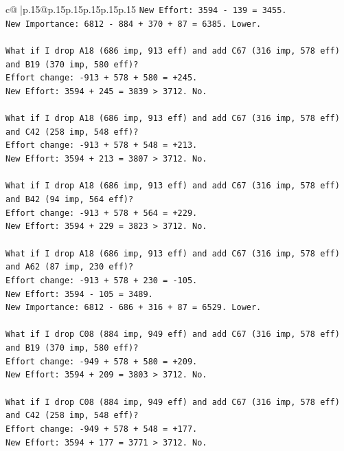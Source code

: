 \documentclass{article}
\begin{document}
{\begin{supertabular}{c@{$\;$}|p{.15\linewidth}@{}p{.15\linewidth}p{.15\linewidth}p{.15\linewidth}p{.15\linewidth}p{.15\linewidth}}
{{{\texttt{New Effort: 3594 {-} 139 = 3455.} \\
\texttt{New Importance: 6812 {-} 884 + 370 + 87 = 6385. Lower.} \\
\\ 
\texttt{What if I drop A18 (686 imp, 913 eff) and add C67 (316 imp, 578 eff) and B19 (370 imp, 580 eff)?} \\
\texttt{Effort change: {-}913 + 578 + 580 = +245.} \\
\texttt{New Effort: 3594 + 245 = 3839 > 3712. No.} \\
\\ 
\texttt{What if I drop A18 (686 imp, 913 eff) and add C67 (316 imp, 578 eff) and C42 (258 imp, 548 eff)?} \\
\texttt{Effort change: {-}913 + 578 + 548 = +213.} \\
\texttt{New Effort: 3594 + 213 = 3807 > 3712. No.} \\
\\ 
\texttt{What if I drop A18 (686 imp, 913 eff) and add C67 (316 imp, 578 eff) and B42 (94 imp, 564 eff)?} \\
\texttt{Effort change: {-}913 + 578 + 564 = +229.} \\
\texttt{New Effort: 3594 + 229 = 3823 > 3712. No.} \\
\\ 
\texttt{What if I drop A18 (686 imp, 913 eff) and add C67 (316 imp, 578 eff) and A62 (87 imp, 230 eff)?} \\
\texttt{Effort change: {-}913 + 578 + 230 = {-}105.} \\
\texttt{New Effort: 3594 {-} 105 = 3489.} \\
\texttt{New Importance: 6812 {-} 686 + 316 + 87 = 6529. Lower.} \\
\\ 
\texttt{What if I drop C08 (884 imp, 949 eff) and add C67 (316 imp, 578 eff) and B19 (370 imp, 580 eff)?} \\
\texttt{Effort change: {-}949 + 578 + 580 = +209.} \\
\texttt{New Effort: 3594 + 209 = 3803 > 3712. No.} \\
\\ 
\texttt{What if I drop C08 (884 imp, 949 eff) and add C67 (316 imp, 578 eff) and C42 (258 imp, 548 eff)?} \\
\texttt{Effort change: {-}949 + 578 + 548 = +177.} \\
\texttt{New Effort: 3594 + 177 = 3771 > 3712. No.} \\
\\ 
}}}
\end{supertabular}}
\end{document}
